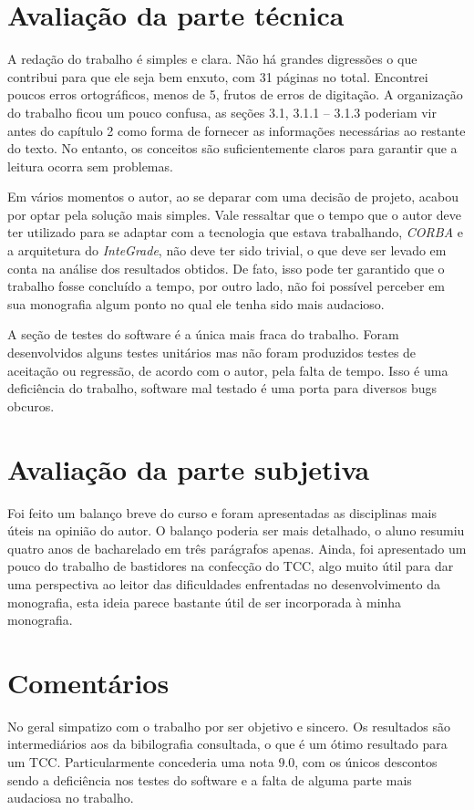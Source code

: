 \documentclass[brazil]{article}
\begin{document}
\section{Avaliação da parte técnica}
	A redação do trabalho é simples e clara. Não há grandes digressões o que contribui para que ele seja bem enxuto, com 31 páginas no total. Encontrei poucos erros ortográficos, menos de 5, frutos de erros de digitação. A organização do trabalho ficou um pouco confusa, as seções 3.1, 3.1.1 -- 3.1.3 poderiam vir antes do capítulo 2 como forma de fornecer as informações necessárias ao restante do texto. No entanto, os conceitos são suficientemente claros para garantir que a leitura ocorra sem problemas.

	Em vários momentos o autor, ao se deparar com uma decisão de projeto, acabou por optar pela solução mais simples. Vale ressaltar que o tempo que o autor deve ter utilizado para se adaptar com a tecnologia que estava trabalhando, \emph{CORBA} e a arquitetura do \emph{InteGrade}, não deve ter sido trivial, o que deve ser levado em conta na análise dos resultados obtidos. De fato, isso pode ter garantido que o trabalho fosse concluído a tempo, por outro lado, não foi possível perceber em sua monografia algum ponto no qual ele tenha sido mais audacioso. 
	
	A seção de testes do software é a única mais fraca do trabalho. Foram desenvolvidos alguns testes unitários mas não foram produzidos testes de aceitação ou regressão, de acordo com o autor, pela falta de tempo. Isso é uma deficiência do trabalho, software mal testado é uma porta para diversos bugs obcuros.
	
\section{Avaliação da parte subjetiva}
	Foi feito um balanço breve do curso e foram apresentadas as disciplinas mais úteis na opinião do autor. O balanço poderia ser mais detalhado, o aluno resumiu quatro anos de bacharelado em três parágrafos apenas. Ainda, foi apresentado um pouco do trabalho de bastidores na confecção do TCC, algo muito útil para dar uma perspectiva ao leitor das dificuldades enfrentadas no desenvolvimento da monografia, esta ideia parece bastante útil de ser incorporada à minha monografia. 
	
\section{Comentários}
	No geral simpatizo com o trabalho por ser objetivo e sincero. Os resultados são intermediários aos da bibilografia consultada, o que é um ótimo resultado para um TCC. Particularmente concederia uma nota $9.0$, com os únicos descontos sendo a deficiência nos testes do software e a falta de alguma parte mais audaciosa no trabalho.


%
%
\end{document}
